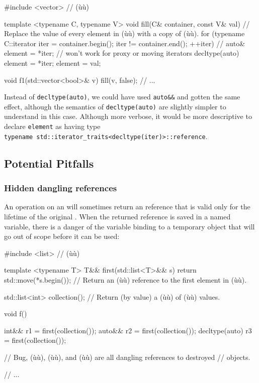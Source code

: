 \begin{emcppslisting}[emcppsstandards={c++14}]
#include <vector>  // (ù{}ù)

template <typename C, typename V>
void fill(C& container, const V& val)
    // Replace the value of every element in (ù{}ù) with a copy of (ù{}ù).
{
    for (typename C::iterator iter = container.begin();
         iter != container.end();
         ++iter)
    {
        // auto& element = *iter;  // won't work for proxy or moving iterators
        decltype(auto) element = *iter;
        element = val;
    }
}

void f1(std::vector<bool>& v)
{
    fill(v, false);
    // ...
}
\end{emcppslisting}
    

Instead of \lstinline!decltype(auto)!, we could have used \lstinline!auto&&!
and gotten the same effect, although the semantics of
\lstinline!decltype(auto)! are slightly simpler to understand in this case.
Although more verbose, it would be more descriptive to declare
\lstinline!element! as having type
\lstinline!typename!~\lstinline!std::iterator_traits<decltype(iter)>::reference!.

\subsection[Potential Pitfalls]{Potential Pitfalls}\label{potential-pitfalls}

\subsubsection[Hidden dangling references]{Hidden dangling references}\label{hidden-dangling-references}

An operation on an  will sometimes return an 
reference that is valid only for the lifetime of the original
. When the returned reference is saved in a named variable,
there is a danger of the variable binding to a temporary object that
will go out of scope before it can be used:

\begin{emcppslisting}[emcppsstandards={c++14}]
#include <list>  // (ù{}ù)

template <typename T>
T&& first(std::list<T>&& s) { return std::move(*s.begin()); }
    // Return an (ù{}ù) reference to the first element in (ù{}ù).

std::list<int> collection();
    // Return (by value) a (ù{}ù) of (ù{}ù) values.

void f()
{
    int&&          r1 = first(collection());
    auto&&         r2 = first(collection());
    decltype(auto) r3 = first(collection());

    // Bug, (ù{}ù), (ù{}ù), and (ù{}ù) are all dangling references to destroyed
    // objects.

    // ...
}
\end{emcppslisting}
    

